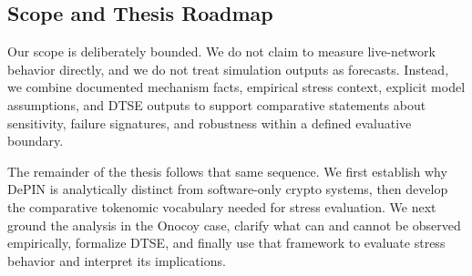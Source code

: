 \subsection{Scope and Thesis Roadmap}
Our scope is deliberately bounded. We do not claim to measure live-network behavior directly, and we do not treat simulation outputs as forecasts. Instead, we combine documented mechanism facts, empirical stress context, explicit model assumptions, and DTSE outputs to support comparative statements about sensitivity, failure signatures, and robustness within a defined evaluative boundary.

The remainder of the thesis follows that same sequence. We first establish why DePIN is analytically distinct from software-only crypto systems, then develop the comparative tokenomic vocabulary needed for stress evaluation. We next ground the analysis in the Onocoy case, clarify what can and cannot be observed empirically, formalize DTSE, and finally use that framework to evaluate stress behavior and interpret its implications.
